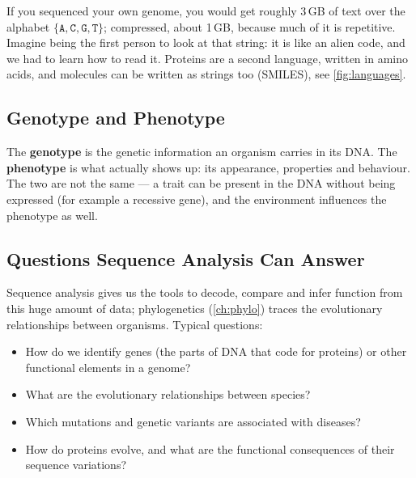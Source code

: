 \documentclass[11pt, oneside]{book}
\newcommand{\seq}[1]{\texttt{#1}}
\let\originalsubsection\subsection
\renewcommand{\subsection}{\Needspace{6\baselineskip}\originalsubsection}
\begin{document}
If you sequenced your own genome, you would get roughly 3\,GB of text over
the alphabet $\{\seq{A}, \seq{C}, \seq{G}, \seq{T}\}$; compressed, about
1\,GB, because much of it is repetitive. Imagine being the first person to
look at that string: it is like an alien code, and we had to learn how to read
it. Proteins are a second language, written in amino acids, and molecules
can be written as strings too (SMILES), see \cref{fig:languages}.

\subsection{Genotype and Phenotype}

\begin{defbox}[title={Genotype vs.\ phenotype}]
The \textbf{genotype} is the genetic information an organism carries in its
DNA. The \textbf{phenotype} is what actually shows up: its appearance,
properties and behaviour. The two are not the same --- a trait can be
present in the DNA without being expressed (for example a recessive gene),
and the environment influences the phenotype as well.
\end{defbox}

\subsection{Questions Sequence Analysis Can Answer}

Sequence analysis gives us the tools to decode, compare and infer function
from this huge amount of data; phylogenetics (\cref{ch:phylo}) traces the
evolutionary relationships between organisms. Typical questions:
\begin{itemize}
  \item How do we identify genes (the parts of DNA that code for proteins)
    or other functional elements in a genome?
  \item What are the evolutionary relationships between species?
  \item Which mutations and genetic variants are associated with diseases?
  \item How do proteins evolve, and what are the functional consequences of
    their sequence variations?
\end{itemize}
\end{document}
